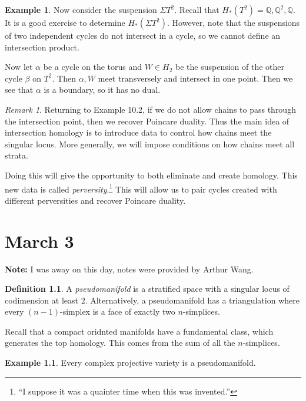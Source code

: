 \documentclass[leqno, openany]{memoir}
\theoremstyle{definition}
\newtheorem{defn}[thm]{Definition}
\newtheorem{exm}[thm]{Example}
\theoremstyle{remark}
\newtheorem{rmk}[thm]{Remark}
\theoremstyle{plain}
\theoremstyle{definition}
\theoremstyle{remark}
\newcommand{\Q}{\mathbb{Q}}
\begin{document}
\begin{exm} Now consider the suspension $\Sigma T^2$. Recall that $H_*(T^2) =
    \Q, \Q^2, \Q$. It is a good exercise to determine $H_*(\Sigma T^2)$.
    However, note that the suspensions of two independent cycles do not
    intersect in a cycle, so we cannot define an intersection product.

    Now let $\alpha$ be a cycle on the torus and $W \in H_2$ be the suspension
of the other cycle $\beta$ on $T^2$. Then $\alpha, W$ meet transversely and
intersect in one point. Then we see that $\alpha$ is a boundary, so it has no
dual.  \end{exm}

\begin{rmk} Returning to Example 10.2, if we do not allow chains to pass
    through the intersection point, then we recover Poincare duality. Thus the
    main idea of intersection homology is to introduce data to control how
    chains meet the singular locus. More generally, we will impose conditions
    on how chains meet all strata. 

    Doing this will give the opportunity to both eliminate and create homology.
This new data is called \textit{perversity}.\footnote{``I suppose it was a
quainter time when this was invented.''} This will allow us to pair cycles
created with different perversities and recover Poincare duality.  \end{rmk}

\chapter{March 3}%

\textbf{Note:} I was away on this day, notes were provided by Arthur Wang.

\begin{defn} A \textit{pseudomanifold} is a stratified space with a singular
locus of codimension at least $2$. Alternatively, a pseudomanifold has a
triangulation where every $(n-1)$-simplex is a face of exactly two
$n$-simplices.  \end{defn}

Recall that a compact oridnted manifolds have a fundamental class, which
generates the top homology. This comes from the sum of all the $n$-simplices.

\begin{exm} Every complex projective variety is a pseudomanifold.  \end{exm}
\end{document}

